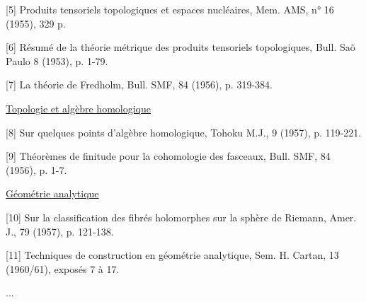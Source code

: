 [5] Produits tensoriels topologiques et espaces nucléaires,
Mem. AMS, n° 16 (1955), 329 p.

[6] Résumé de la théorie métrique des produits tensoriels
topologiques, Bull. Sa\~o Paulo 8 (1953), p. 1-79.

[7] La théorie de Fredholm, Bull. SMF, 84 (1956), p. 319-384.

\uline{Topologie et algèbre homologique}

[8] Sur quelques points d'algèbre homologique, Tohoku M.J.,
9 (1957), p. 119-221.

[9] Théorèmes de finitude pour la cohomologie des fasceaux,
Bull. SMF, 84 (1956), p. 1-7.

\uline{Géométrie analytique}

[10] Sur la classification des fibrés holomorphes sur la
sphère de Riemann, Amer. J., 79 (1957), p. 121-138.

[11] Techniques de construction en géométrie analytique,
Sem. H. Cartan, 13 (1960/61), exposés 7 à 17.

...

